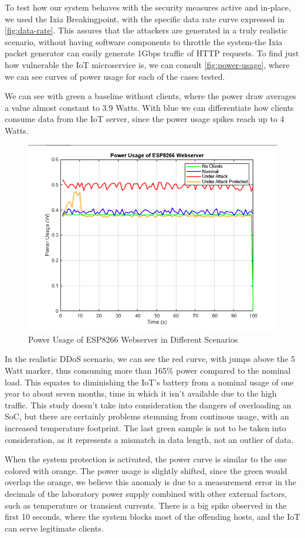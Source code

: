 To test how our system behaves with the security measures active and in-place, we used the Ixia Breakingpoint, with the specific data rate curve expressed in \autoref{fig:data-rate}\cite{vladescu2025}. This assures that the attackers are generated in a truly realistic scenario, without having software components to throttle the system-the Ixia packet generator can easily generate 1Gbps traffic of HTTP requests. To find just how vulnerable the IoT microservice is, we can consult \autoref{fig:power-usage}\cite{vladescu2025}, where we can see curves of power usage for each of the cases tested. 

We can see with green a baseline without clients, where the power draw averages a value almost constant to 3.9 Watts. With blue we can differentiate how clients consume data from the IoT server, since the power usage spikes reach up to 4 Watts. 

\begin{figure}
    \centering
    \includegraphics[width=0.8\linewidth]{images/power_usage_esp8266.png}
    \caption{Power Usage of ESP8266 Webserver in Different Scenarios}
    \label{fig:power-usage}
\end{figure}

In the realistic DDoS scenario, we can see the red curve, with jumps above the 5 Watt marker, thus consuming more than 165\% power compared to the nominal load. This equates to diminishing the IoT's battery from a nominal usage of one year to about seven months, time in which it isn't available due to the high traffic. This study doesn't take into consideration the dangers of overloading an SoC, but there are certainly problems stemming from continous usage, with an increased temperature footprint. The last green sample is not to be taken into consideration, as it represents a mismatch in data length, not an outlier of data.

When the system protection is activated, the power curve is similar to the one colored with orange. The power usage is slightly shifted, since the green would overlap the orange, we believe this anomaly is due to a measurement error in the decimals of the laboratory power supply combined with other external factors, such as temperature or transient currents. There is a big spike observed in the first 10 seconds, where the system blocks most of the offending hosts, and the IoT can serve legitimate clients.

